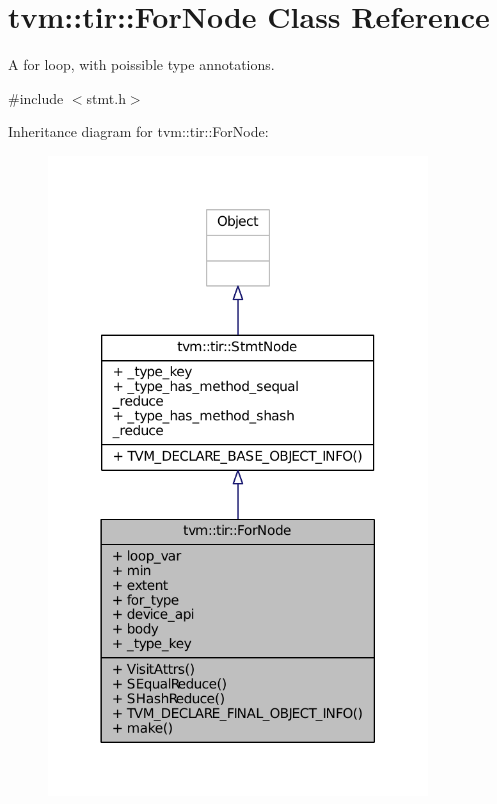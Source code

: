 \hypertarget{classtvm_1_1tir_1_1ForNode}{}\section{tvm\+:\+:tir\+:\+:For\+Node Class Reference}
\label{classtvm_1_1tir_1_1ForNode}


A for loop, with poissible type annotations.  




{\ttfamily \#include $<$stmt.\+h$>$}



Inheritance diagram for tvm\+:\+:tir\+:\+:For\+Node\+:
\nopagebreak
\begin{figure}[H]
\begin{center}
\leavevmode
\includegraphics[width=285pt]{classtvm_1_1tir_1_1ForNode__inherit__graph}
\end{center}
\end{figure}


